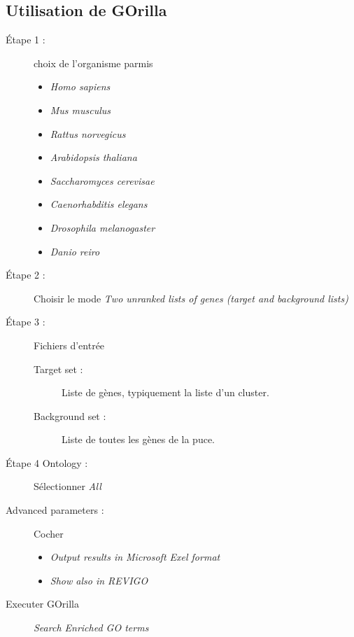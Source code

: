 \subsection*{Utilisation de GOrilla}

\begin{description}
	\item [Étape 1 :]  choix de l'organisme parmis
		\begin{itemize}
			\item \emph{Homo sapiens}
			\item \emph{Mus musculus}
			\item \emph{Rattus norvegicus}
			\item \emph{Arabidopsis thaliana}
			\item \emph{Saccharomyces cerevisae}
			\item \emph{Caenorhabditis elegans}
			\item \emph{Drosophila melanogaster}
			\item \emph{Danio reiro}
		\end{itemize}
	\item [Étape 2 :] Choisir le mode \emph{Two unranked lists of genes (target and background lists)}
	\item [Étape 3 :] Fichiers d'entrée  
		\begin{description}
			\item [Target set : ] Liste de gènes, typiquement la liste d'un cluster.
			\item [Background set : ] Liste de toutes les gènes de la puce.
		\end{description}
	\item [Étape 4 Ontology : ] Sélectionner \emph{All}
	\item [Advanced parameters : ]  Cocher 
		\begin{itemize}
			\item \emph{Output results in Microsoft Exel format}
			\item \emph{Show also in REVIGO}
		\end{itemize}
	\item[Executer GOrilla] \emph{Search Enriched GO terms}
\end{description}

